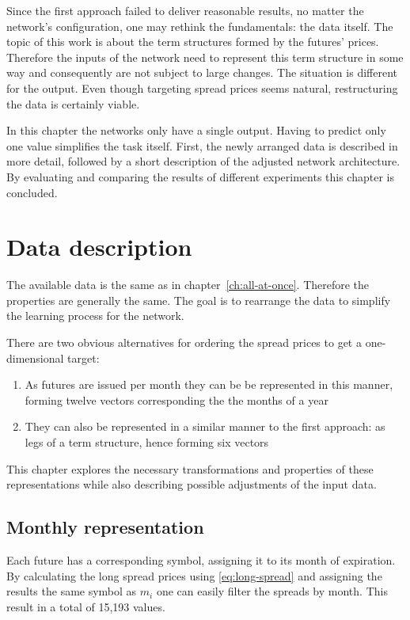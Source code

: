 Since the first approach failed to deliver reasonable results, no matter the network's configuration, one may rethink the fundamentals: the data itself. The topic of this work is about the term structures formed by the futures' prices. Therefore the inputs of the network need to represent this term structure in some way and consequently are not subject to large changes. The situation is different for the output. Even though targeting spread prices seems natural, restructuring the data is certainly viable.

In this chapter the networks only have a single output. Having to predict only one value simplifies the task itself. First, the newly arranged data is described in more detail, followed by a short description of the adjusted network architecture. By evaluating and comparing the results of different experiments this chapter is concluded.

\section{Data description}

The available data is the same as in chapter~\ref{ch:all-at-once}. Therefore the properties are generally the same. The goal is to rearrange the data to simplify the learning process for the network. 

There are two obvious alternatives for ordering the spread prices to get a one-dimensional target:

\begin{enumerate}
	\item As futures are issued per month they can be be represented in this manner, forming twelve vectors corresponding the the months of a year
	\item They can also be represented in a similar manner to the first approach: as legs of a term structure, hence forming six vectors
\end{enumerate}

This chapter explores the necessary transformations and properties of these representations while also describing possible adjustments of the input data.

\subsection{Monthly representation}
\label{sec:oao-monthly-representation}

Each future has a corresponding symbol, assigning it to its month of expiration. By calculating the long spread prices using \eqref{eq:long-spread} and assigning the results the same symbol as $m_i$ one can easily filter the spreads by month. This result in a total of 15,193 values.

